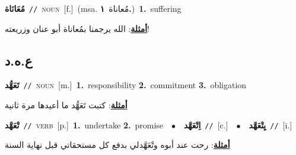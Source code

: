 \documentclass[10pt,a4paper,twoside]{article} %
\begin{document}
\begin{multicols}{2}
{\setlength\topsep{0pt}\textbf{\foreignlanguage{arabic}{مُعَانَاة}}\ {\color{gray}\texttt{//}\color{black}}\ \textsc{noun}\ [f.]\ \color{gray}(msa. \foreignlanguage{arabic}{مُعاناة}~\foreignlanguage{arabic}{\textbf{١.}})\color{black}\ \textbf{1.}~suffering\  \begin{flushright}\color{gray}\foreignlanguage{arabic}{\textbf{\underline{\foreignlanguage{arabic}{أمثلة}}}: الله يرجمنا بمُعاناة أبو عنان وزريعته!}\end{flushright}\color{black}} \vspace{2mm}

\vspace{-3mm}
\subsection*{\color{blue}\foreignlanguage{arabic}{ع.ه.د}\color{blue}{}} 

{\setlength\topsep{0pt}\textbf{\foreignlanguage{arabic}{تَعَهُّد}}\ {\color{gray}\texttt{//}\color{black}}\ \textsc{noun}\ [m.]\ \textbf{1.}~responsibility  \textbf{2.}~commitment  \textbf{3.}~obligation\  \begin{flushright}\color{gray}\foreignlanguage{arabic}{\textbf{\underline{\foreignlanguage{arabic}{أمثلة}}}: كتبت تَعَهُّد ما أعيدها مرة ثانية}\end{flushright}\color{black}} \vspace{2mm}

{\setlength\topsep{0pt}\textbf{\foreignlanguage{arabic}{تْعَهَّد}}\ {\color{gray}\texttt{//}\color{black}}\ \textsc{verb}\ [p.]\ \textbf{1.}~undertake  \textbf{2.}~promise\ \ $\bullet$\ \ \setlength\topsep{0pt}\textbf{\foreignlanguage{arabic}{اِتْعَهَّد}}\ {\color{gray}\texttt{//}\color{black}}\ [c.]\ \ $\bullet$\ \ \setlength\topsep{0pt}\textbf{\foreignlanguage{arabic}{يِتْعَهَّد}}\ {\color{gray}\texttt{//}\color{black}}\ [i.]\  \begin{flushright}\color{gray}\foreignlanguage{arabic}{\textbf{\underline{\foreignlanguage{arabic}{أمثلة}}}: رحت عند أبوه وتْعَهَّدلي بدفع كل مستحقاتي قبل نهاية السنة}\end{flushright}\color{black}} \vspace{2mm}


\end{multicols}
\end{document}
